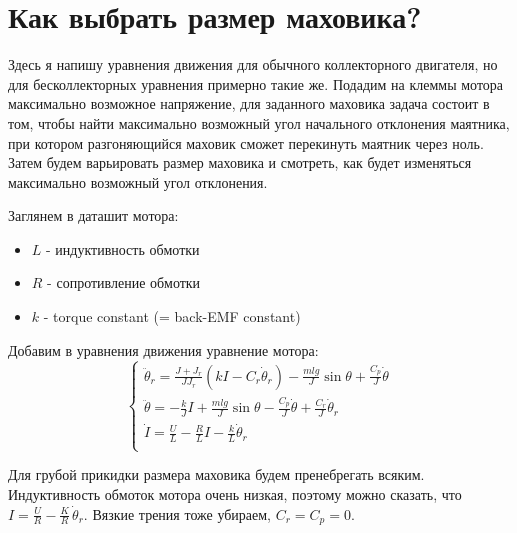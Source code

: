 \documentclass{article}
\begin{document}
\section{Как выбрать размер маховика?} \label{sec:wheelSize}
Здесь я напишу уравнения движения для обычного коллекторного двигателя, но для бесколлекторных уравнения примерно такие же.
Подадим на клеммы мотора максимально возможное напряжение, для заданного маховика задача состоит в том, чтобы найти максимально возможный угол начального отклонения маятника, при котором разгоняющийся маховик сможет перекинуть маятник через ноль.
Затем будем варьировать размер маховика и смотреть, как будет изменяться максимально возможный угол отклонения.

Заглянем в даташит мотора:
\begin{itemize}
    \item $L$ - индуктивность обмотки
    \item $R$ - сопротивление обмотки
    \item $k$ - torque constant (= back-EMF constant)
\end{itemize}

Добавим в уравнения движения уравнение мотора:
$$
\left\{
\begin{array}{l}
\ddot\theta_r = \frac{J+J_r}{J J_r}(kI - C_r\dot\theta_r)  -\frac{mlg}{J}\sin\theta + \frac{C_p}{J}\dot\theta\\
\ddot \theta  = -\frac{k}{J} I + \frac{mlg}{J}\sin\theta - \frac{C_p}{J} \dot\theta + \frac{C_r}{J} \dot\theta_r\\
\dot I  = \frac{U}{L} - \frac{R}{L}I - \frac{k}{L} \dot\theta_r\\
\end{array}
\right.
$$

Для грубой прикидки размера маховика будем пренебрегать всяким. Индуктивность обмоток мотора очень низкая, поэтому можно сказать, что $I=\frac{U}{R}-\frac{K}{R}\,\dot\theta_r$. Вязкие трения тоже убираем, $C_r=C_p=0$. 
\end{document}
